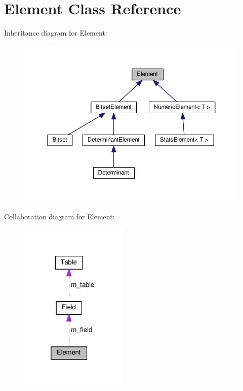 \hypertarget{classElement}{}\section{Element Class Reference}
\label{classElement}


Inheritance diagram for Element\+:
\nopagebreak
\begin{figure}[H]
\begin{center}
\leavevmode
\includegraphics[width=350pt]{classElement__inherit__graph}
\end{center}
\end{figure}


Collaboration diagram for Element\+:
\nopagebreak
\begin{figure}[H]
\begin{center}
\leavevmode
\includegraphics[width=145pt]{classElement__coll__graph}
\end{center}
\end{figure}

